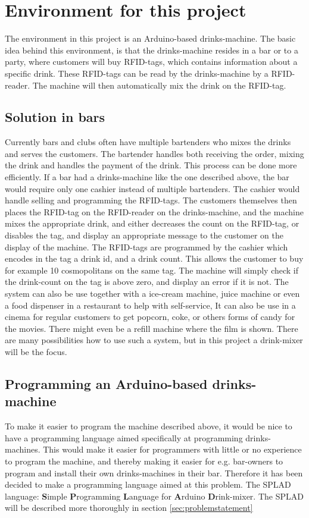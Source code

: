 \section{Environment for this project}
The environment in this project is an Arduino-based drinks-machine. The basic idea behind this environment, is that the drinks-machine resides in a bar or to a party, where customers will buy RFID-tags, which contains information about a specific drink. These RFID-tags can be read by the drinks-machine by a RFID-reader. The machine will then automatically mix the drink on the RFID-tag.

\subsection{Solution in bars}
Currently bars and clubs often have multiple bartenders who mixes the drinks and serves the customers. The bartender handles both receiving the order, mixing the drink and handles the payment of the drink. This process can be done more efficiently. If a bar had a drinks-machine like the one described above, the bar would require only one cashier instead of multiple bartenders. The cashier would handle selling and programming the RFID-tags. The customers themselves then places the RFID-tag on the RFID-reader on the drinks-machine, and the machine mixes the appropriate drink, and either decreases the count on the RFID-tag, or disables the tag, and display an appropriate message to the customer on the display of the machine. The RFID-tags are programmed by the cashier which encodes in the tag a drink id, and a drink count. This allows the customer to buy for example 10 cosmopolitans on the same tag. The machine will simply check if the drink-count on the tag is above zero, and display an error if it is not.
The system can also be use together with a ice-cream machine, juice machine or even a food dispenser in a restaurant to help with self-service, It can also be use in a cinema for regular customers to get popcorn, coke, or others forms of candy for the movies. There might even be a refill machine where the film is shown. There are many possibilities how to use such a system, but in this project a drink-mixer will be the focus.
\subsection{Programming an Arduino-based drinks-machine}
To make it easier to program the machine described above, it would be nice to have a programming language aimed specifically at programming drinks-machines. This would make it easier for programmers with little or no experience to program the machine, and thereby making it easier for e.g. bar-owners to program and install their own drinks-machines in their bar. Therefore it has been decided to make a programming language aimed at this problem. The SPLAD language: \textbf{S}imple \textbf{P}rogramming \textbf{L}anguage for \textbf{A}rduino \textbf{D}rink-mixer. The SPLAD will be described more thoroughly in section \ref{sec:problemstatement}